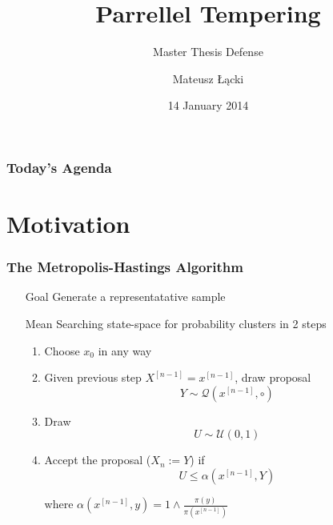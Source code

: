 \documentclass[xetex]{beamer}
\title[Parrellel Tempering]{Parrellel Tempering }
\subtitle{Master Thesis Defense}
\date{14 January 2014}
\author[Łącki]{Mateusz Łącki}
\institute[UW]{Uniwersytet Warszawski}
\begin{document}


	\begin{frame}
		\titlepage
	\end{frame}


	\begin{frame}
		\frametitle{Today's Agenda}
		\tableofcontents
	\end{frame}

\section{Motivation}


	\begin{frame}[t]\frametitle{The Metropolis-Hastings Algorithm}
	    
		\begin{itemize}
			\item[Goal] 	Generate a representatative sample
			\item[Mean]		Searching state-space for probability clusters in 2 steps
			\begin{enumerate}
				\item 	Choose $x_0$ in any way

				\item  	Given previous step $X^{[n-1]} = x^{[n-1]}$, draw proposal
					$$ Y \sim \mathcal{Q}(x^{[n-1]}, \circ) $$

				\item 	Draw
					$$ U \sim \mathcal{U}(0,1) $$	

				\item 	Accept the proposal ($X_{n} := Y$) if 
					$$ U \leq \alpha(x^{[n-1]},Y) $$
				\item[where] $\alpha (x^{[n-1]},y) = 1 \wedge \frac{\pi(y)}{\pi(x^{[n-1]})}$ 
			\end{enumerate}

		\end{itemize}
	
	\end{frame}

\end{document}
